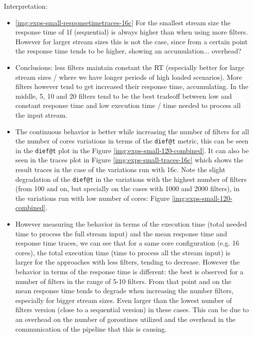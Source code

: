 Interpretation:
\begin{itemize}
     \item \ref{img:exps-small-responsetimetraces-16c} For the smallest stream size 
     the response time of 1f (sequential) is always higher than when using more filters. However for larger stream sizes this is not the case, since from a certain point the response time tends to be higher, showing an accumulation... overhead?
     \item Conclusions: less filters maintain constant the RT (especially better for large stream sizes / where we have longer periods of high loaded scenarios). More filters however tend to get increased their response time, accumulating. In the middle, 5, 10 and 20 filters tend to be the best tradeoff between low and constant response time and low execution time / time needed to process all the input stream.
     \item The continuous behavior is better while increasing the number of filters for all the number of cores variations in terms of the \texttt{dief@t} metric, this can be seen in the \texttt{dief@t} plot in the Figure \ref{img:exps-small-120-combined}. It can also be seen in the traces plot in Figure \ref{img:exps-small-traces-16c} which shows the result traces in the case of the variations run with 16c. Note the slight degradation of the \texttt{dief@t} in the variations with the highest number of filters (from 100 and on, but specially on the cases with 1000 and 2000 filters), in the variations run with low number of cores: Figure \ref{img:exps-small-120-combined}.
     \item However measuring the behavior in terms of the execution time (total needed time to process the full stream input) and the mean response time and response time traces, we can see that for a same core configuration (e.g. 16 cores), the total execution time (time to process all the stream input) is larger for the approaches with less filters, tending to decrease. However the behavior in terms of the response time is different: the best is observed for a number of filters in the range of 5-10 filters. From that point and on the mean response time tends to degrade when increasing the number filters, especially for bigger stream sizes. Even larger than the lowest number of filters version (close to a sequential version) in these cases. This can be due to an overhead on the number of goroutines utilized and the overhead in the communication of the pipeline that this is causing.
\end{itemize}


